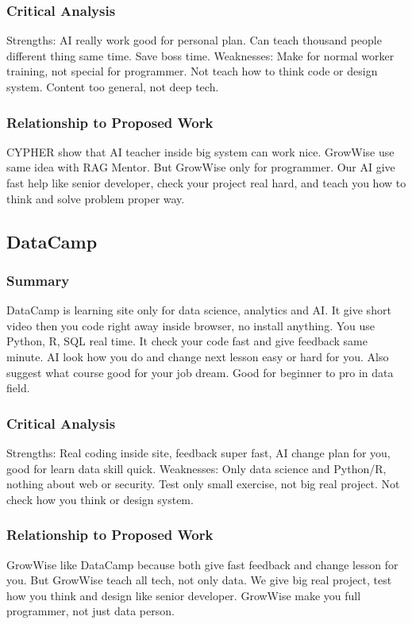 \documentclass{FastFyp}
\begin{document}
\subsubsection{Critical Analysis}
Strengths: AI really work good for personal plan. Can teach thousand people different thing same time. Save boss time.  
Weaknesses: Make for normal worker training, not special for programmer. Not teach how to think code or design system. Content too general, not deep tech.

\subsubsection{Relationship to Proposed Work}
CYPHER show that AI teacher inside big system can work nice. GrowWise use same idea with RAG Mentor. But GrowWise only for programmer. Our AI give fast help like senior developer, check your project real hard, and teach you how to think and solve problem proper way.


\subsection{DataCamp}

\subsubsection{Summary}
DataCamp \cite{datacamp2023} is learning site only for data science, analytics and AI. It give short video then you code right away inside browser, no install anything. You use Python, R, SQL real time. It check your code fast and give feedback same minute. AI look how you do and change next lesson easy or hard for you. Also suggest what course good for your job dream. Good for beginner to pro in data field.

\subsubsection{Critical Analysis}
Strengths: Real coding inside site, feedback super fast, AI change plan for you, good for learn data skill quick.  
Weaknesses: Only data science and Python/R, nothing about web or security. Test only small exercise, not big real project. Not check how you think or design system.

\subsubsection{Relationship to Proposed Work}
GrowWise like DataCamp because both give fast feedback and change lesson for you. But GrowWise teach all tech, not only data. We give big real project, test how you think and design like senior developer. GrowWise make you full programmer, not just data person.
\end{document}
